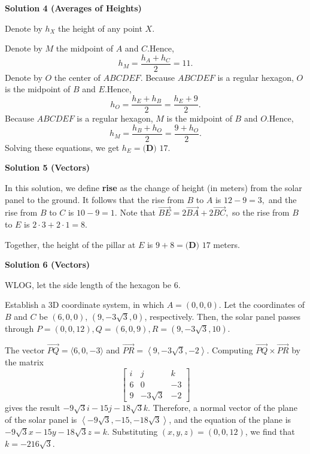 \begin{enumerate}
 



\textbf{Solution 4 (Averages of Heights)}

Denote by $h_X$ the height of any point $X$.

 Denote by $M$ the midpoint of $A$ and $C$.Hence, 
 \[h_M = \frac{h_A + h_C}{2} = 11.\]Denote by $O$ the center of $ABCDEF$. Because $ABCDEF$ is a regular hexagon, $O$ is the midpoint of $B$ and $E$.Hence, 
 \[h_O = \frac{h_E + h_B}{2} = \frac{h_E + 9}{2}.\]Because $ABCDEF$ is a regular hexagon, $M$ is the midpoint of $B$ and $O$.Hence, 
 \[h_M = \frac{h_B + h_O}{2} = \frac{9 + h_O}{2}.\]Solving these equations, we get $h_E = \boxed{\textbf{(D) } 17}$.

 



\textbf{Solution 5 (Vectors)}

In this solution, we define \textbf{rise} as the change of height (in meters) from the solar panel to the ground. It follows that the rise from $B$ to $A$ is $12-9=3,$ and the rise from $B$ to $C$ is $10-9=1.$ Note that $\vec{BE}=2\vec{BA}+2\vec{BC},$ so the rise from $B$ to $E$ is $2\cdot3+2\cdot1=8.$

 Together, the height of the pillar at $E$ is $9+8=\boxed{\textbf{(D) } 17}$ meters.

 



\textbf{Solution 6 (Vectors)}

WLOG, let the side length of the hexagon be $6$. 

 Establish a 3D coordinate system, in which $A=(0,0,0)$. Let the coordinates of $B$ and $C$ be $(6,0,0)$, $\left(9,-3\sqrt{3},0\right)$, respectively. Then, the solar panel passes through $P=(0,0,12), Q=(6,0,9), R=\left(9,-3\sqrt{3},10\right)$. 

 The vector $\vec{PQ}=\langle 6,0,-3\rangle$ and $\vec{PR}=\left\langle 9,-3\sqrt{3}, -2\right\rangle$. Computing $\vec{PQ} \times \vec{PR}$ by the matrix
 \[\begin{bmatrix} i & j & k \\ 6 & 0 & -3 \\ 9 & -3\sqrt{3} & -2 \end{bmatrix}\]gives the result $-9\sqrt{3}i -15j -18\sqrt{3} k$. Therefore, a normal vector of the plane of the solar panel is $\left\langle -9\sqrt{3},-15,-18\sqrt{3}\right\rangle$, and the equation of the plane is $-9\sqrt{3}x-15y-18\sqrt{3}z=k$. Substituting $(x,y,z)=(0,0,12)$, we find that $k=-216\sqrt{3}$.


\end{enumerate}
